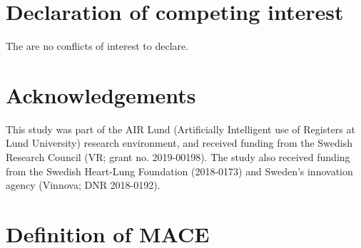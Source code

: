 \documentclass[preprint]{elsarticle}
\begin{document}
\section*{Declaration of competing interest}
The are no conflicts of interest to declare.

\section*{Acknowledgements}
This study was part of the AIR Lund (Artificially Intelligent use of Registers at Lund University) research environment, and received funding from the Swedish Research Council (VR; grant no. 2019-00198). The study also received funding from the Swedish Heart-Lung Foundation (2018-0173) and Sweden's innovation agency (Vinnova; DNR 2018-0192). 



\appendix
\section{Definition of MACE}
\label{sec:appendix:mace}
\end{document}

